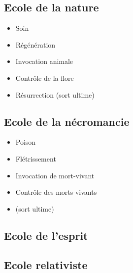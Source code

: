 \subsection{Ecole de la nature}
\begin{itemize}
\item Soin
\item Régénération
\item Invocation animale
\item Contrôle de la flore
\item Résurrection (sort ultime)
\end{itemize}

\subsection{Ecole de la nécromancie}
\begin{itemize}
\item Poison
\item Flétrissement
\item Invocation de mort-vivant
\item Contrôle des morts-vivants
\item (sort ultime)
\end{itemize}

\subsection{Ecole de l'esprit}

\subsection{Ecole relativiste}